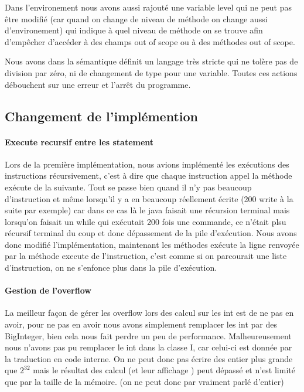 Dans l'environement nous avons aussi rajouté une variable level qui ne peut pas être modifié (car quand on change de niveau de méthode on change aussi d'environement) qui indique à quel niveau de méthode on se trouve afin d'empêcher d'accéder à des champs out of scope ou à des méthodes out of scope. 


Nous avons dans la sémantique définit un langage très stricte qui ne tolère pas de division par zéro, ni de changement de type pour une variable. Toutes ces actions débouchent sur une erreur et l'arrêt du programme. 


\subsection{Changement de l'implémention}
\paragraph{Execute recursif entre les statement}
Lors de la première implémentation, nous avions implémenté les exécutions des instructions récursivement, c'est à dire que chaque instruction appel la méthode exécute de la suivante. Tout se passe bien quand il n'y pas beaucoup d'instruction et même lorsqu'il y a en beaucoup réellement écrite (200 write à la suite par exemple) car dans ce cas là le java faisait une récursion terminal mais lorsqu'on faisait un while qui exécutait 200 fois une commande, ce n'était plsu récursif terminal du coup et donc dépassement de la pile d'exécution. Nous avons donc modifié l'implémentation, maintenant les méthodes exécute la ligne renvoyée par la méthode execute de l'instruction, c'est comme si on parcourait une liste d'instruction, on ne s'enfonce plus dans la pile d'exécution.

\paragraph{Gestion de l'overflow}
La meilleur façon de gérer les overflow lors des calcul sur les int est de ne pas en avoir, pour ne pas en avoir nous avons simplement remplacer les int par des BigInteger, bien cela nous fait perdre un peu de performance. Malheureusement nous n'avons pas pu remplacer le int dans la classe I, car celui-ci est donnée par la traduction en code interne. On ne peut donc pas écrire des entier plus grande que $2^{32}$ mais le résultat des calcul (et leur affichage ) peut dépassé et n'est limité que par la taille de la mémoire. (on ne peut donc par vraiment parlé d'entier)

